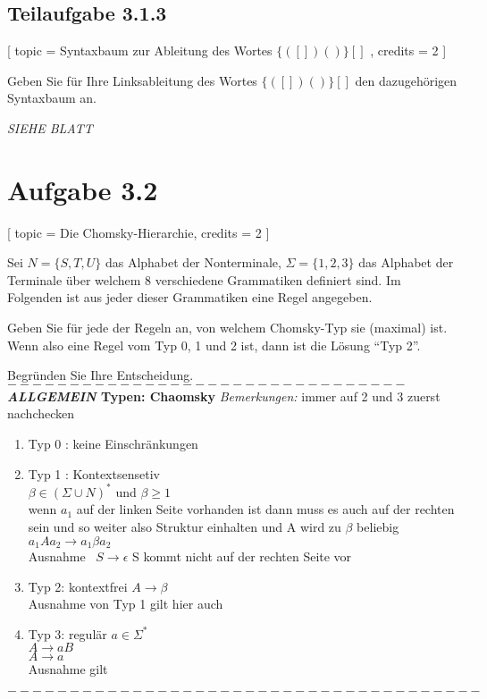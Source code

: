 \documentclass[12pt]{article}
\begin{document}
 \subsection*{Teilaufgabe 3.1.3} [ 
 topic = {Syntaxbaum zur Ableitung des Wortes $\{([])()\}[]$ }, 
 credits = 2 
 ] 
  
 Geben Sie für Ihre Linksableitung des Wortes $\{([])()\}[]$ den dazugehörigen Syntaxbaum an. 
  
\textit{  \emph{SIEHE BLATT}
} \section*{Aufgabe 3.2} [ 
 topic = Die Chomsky-Hierarchie, 
 credits = 2 
 ] 
  
 Sei $N = \{S,T,U\}$ das Alphabet der Nonterminale, $\Sigma = \{1,2,3\}$ das Alphabet der Terminale über welchem 8 verschiedene Grammatiken definiert sind. Im Folgenden ist aus jeder dieser Grammatiken eine Regel angegeben.  
  
 Geben Sie für jede der Regeln an, von welchem Chomsky-Typ sie (maximal) ist. Wenn also eine Regel vom Typ 0, 1 und 2 ist, dann ist die Lösung "`Typ 2"'. 
  
 Begründen Sie Ihre Entscheidung.  \\
  $--------------------------------$
\textbf{\textit{ALLGEMEIN} Typen: Chaomsky
}
 \textit{Bemerkungen:} immer auf 2 und 3 zuerst nachchecken

\begin{enumerate}
\item   Typ 0 : keine Einschränkungen
\item   Typ 1 : Kontextsensetiv \\
 $\beta\in(\Sigma \cup N)^*$ und $\beta \geq 1$ \\
wenn $a_1$ auf der linken Seite vorhanden ist dann muss es auch auf der rechten sein und so weiter also Struktur einhalten und A wird zu $\beta$ beliebig\\
    $a_1Aa_2 \rightarrow a_1 \beta a_2$\\
     Ausnahme \
    $S \rightarrow \epsilon$
     S kommt nicht auf der rechten Seite vor
\item   Typ 2: kontextfrei
    $A \rightarrow \beta$\\
    Ausnahme von Typ 1 gilt hier auch
\item Typ 3: regulär 
$a\in \Sigma^*$ \\
    $A \rightarrow aB$ \\
    $A \rightarrow a $\\
     Ausnahme gilt\
     
\end{enumerate}
$--------------------------------------$\\ \\
\end{document}
